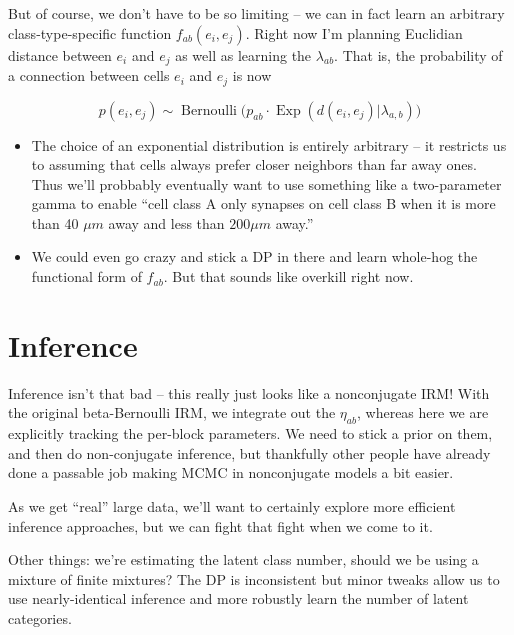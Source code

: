 \documentclass{article}
\begin{document}
But of course, we don't have to be so limiting -- we can in fact
learn an arbitrary class-type-specific function $f_{ab}(e_i, e_j)$. Right
now I'm planning Euclidian distance between $e_i$ and $e_j$ as well as learning
the $\lambda_{ab}$. That is, the probability of a connection between
cells $e_i$ and $e_j$ is now

\begin{equation}
p(e_i, e_j) \sim \operatorname{Bernoulli}\Big(p_{ab}\cdot \operatorname{Exp}(d(e_i, e_j) | \lambda_{a, b})\Big)
\end{equation}


\begin{itemize}
\item The choice of an exponential distribution is entirely arbitrary
  -- it restricts us to assuming that cells always prefer closer
  neighbors than far away ones. Thus we'll probbably eventually want
  to use something like a two-parameter gamma to enable ``cell class A
  only synapses on cell class B when it is more than 40 $\mu m$ away
  and less than $200 \mu m$ away.''
\item We could even go crazy and stick a DP in there and learn
  whole-hog the functional form of $f_{ab}$. But that sounds
  like overkill right now. 
\end{itemize}

\section{Inference}

Inference isn't that bad -- this really just looks like a nonconjugate
IRM! With the original beta-Bernoulli IRM, we integrate out the
$\eta_{ab}$, whereas here we are explicitly tracking the per-block
parameters. We need to stick a prior on them, and then do
non-conjugate inference, but thankfully other
people \parencite{Neal2000} have already done a passable job
making MCMC in nonconjugate models a bit easier. 

As we get ``real'' large data, we'll want to certainly explore
more efficient inference approaches, but we can fight that fight
when we come to it. 

Other things: we're estimating the latent class number, should we be
using a mixture of finite mixtures? The DP is inconsistent
\parencite{Miller2012} but minor tweaks allow us to use nearly-identical
inference and more robustly learn the number of latent categories.


\printbibliography
\end{document}
